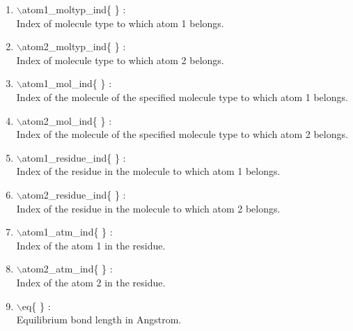 \documentclass[12pt,titlepage]{article}
\begin{document}
\begin{enumerate}

 \vspace{0.15in} 
 \item  $\backslash$atom1\_moltyp\_ind\{ \} : \\ 
    Index of molecule type to which atom 1 belongs.

 \vspace{0.15in} 
 \item  $\backslash$atom2\_moltyp\_ind\{ \} : \\ 
    Index of molecule type to which atom 2 belongs.

 \vspace{0.15in} 
 \item  $\backslash$atom1\_mol\_ind\{ \} : \\    
    Index of the molecule of the specified molecule type 
    to which atom 1 belongs.

 \vspace{0.15in} 
 \item  $\backslash$atom2\_mol\_ind\{ \} : \\    
    Index of the molecule of the specified molecule type 
    to which atom 2 belongs.

 \vspace{0.15in} 
 \item  $\backslash$atom1\_residue\_ind\{ \} : \\ 
    Index of the residue in the molecule to which atom 1 belongs.

 \vspace{0.15in} 
 \item  $\backslash$atom2\_residue\_ind\{ \} : \\ 
    Index of the residue in the molecule to which atom 2 belongs.

 \vspace{0.15in} 
 \item  $\backslash$atom1\_atm\_ind\{ \} : \\    
    Index of the atom 1 in the residue.
 
 \vspace{0.15in} 
 \item  $\backslash$atom2\_atm\_ind\{ \} : \\     
    Index of the atom 2 in the residue.
 
 \vspace{0.15in} 
 \item  $\backslash$eq\{ \} : \\               
    Equilibrium bond length in Angstrom.
  

\end{enumerate}
\end{document}
